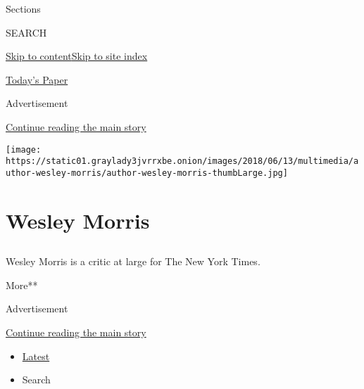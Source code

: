 Sections

SEARCH

\protect\hyperlink{site-content}{Skip to
content}\protect\hyperlink{site-index}{Skip to site index}

\href{https://myaccount.nytimes3xbfgragh.onion/auth/login?response_type=cookie\&client_id=vi}{}

\href{https://www.nytimes3xbfgragh.onion/section/todayspaper}{Today's
Paper}

Advertisement

\protect\hyperlink{after-top}{Continue reading the main story}

\texttt{[image: https://static01.graylady3jvrrxbe.onion/images/2018/06/13/multimedia/author-wesley-morris/author-wesley-morris-thumbLarge.jpg]}

\hypertarget{wesley-morris}{%
\section{Wesley Morris}\label{wesley-morris}}

\subsection{}

Wesley Morris is a critic at large for The New York Times.

More**

Advertisement

\protect\hyperlink{after-mid1}{Continue reading the main story}

\begin{itemize}
\tightlist
\item
  \protect\hyperlink{stream-panel}{Latest}
\item
  Search
\end{itemize}

